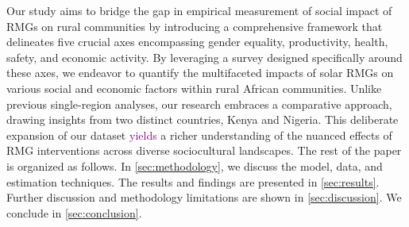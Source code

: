 Our study aims to bridge the gap in empirical measurement of social impact of RMGs on rural communities by introducing a comprehensive framework that delineates five crucial axes encompassing gender equality, productivity, health, safety, and economic activity. By leveraging a survey designed specifically around these axes, we endeavor to quantify the multifaceted impacts of solar RMGs on various social and economic factors within rural African communities. Unlike previous single-region analyses, our research embraces a comparative approach, drawing insights from two distinct countries, Kenya and Nigeria. This deliberate expansion of our dataset \textcolor{purple}{yields} a richer understanding of the nuanced effects of RMG interventions across diverse sociocultural landscapes. The rest of the paper is organized as follows. In \cref{sec:methodology}, we discuss the model, data, and estimation techniques. The results and findings are presented in \cref{sec:results}. Further discussion and methodology limitations are shown in \cref{sec:discussion}. We conclude in \cref{sec:conclusion}.